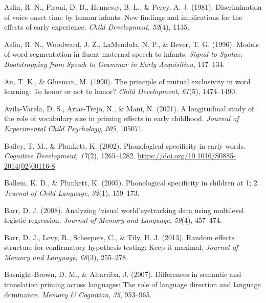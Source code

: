 \documentclass[
  12pt,
  b5paperpaper,
  twoside]{scrreprt}
\newlength{\cslhangindent}
\newlength{\cslentryspacingunit} %
\newenvironment{CSLReferences}[2] %
 {%
  \setlength{\parindent}{0pt}
  \ifodd #1
  \let\oldpar\par
  \def\par{\hangindent=\cslhangindent\oldpar}
  \fi
  \setlength{\parskip}{#2\cslentryspacingunit}
 }%
 {}
\begin{document}
\begin{CSLReferences}{1}{0}
\leavevmode{}%
Aslin, R. N., Pisoni, D. B., Hennessy, B. L., \& Perey, A. J. (1981).
Discrimination of voice onset time by human infants: New findings and
implications for the effects of early experience. \emph{Child
Development}, \emph{52}(4), 1135.

\leavevmode{}%
Aslin, R. N., Woodward, J. Z., LaMendola, N. P., \& Bever, T. G. (1996).
Models of word segmentation in fluent maternal speech to infants.
\emph{Signal to Syntax: Bootstrapping from Speech to Grammar in Early
Acquisition}, 117--134.

\leavevmode{}%
Au, T. K., \& Glusman, M. (1990). The principle of mutual exclusivity in
word learning: To honor or not to honor? \emph{Child Development},
\emph{61}(5), 1474--1490.

\leavevmode{}%
Avila-Varela, D. S., Arias-Trejo, N., \& Mani, N. (2021). A longitudinal
study of the role of vocabulary size in priming effects in early
childhood. \emph{Journal of Experimental Child Psychology}, \emph{205},
105071.

\leavevmode{}%
Bailey, T. M., \& Plunkett, K. (2002). Phonological specificity in early
words. \emph{Cognitive Development}, \emph{17}(2), 1265--1282.
\url{https://doi.org/10.1016/S0885-2014(02)00116-8}

\leavevmode{}%
Ballem, K. D., \& Plunkett, K. (2005). Phonological specificity in
children at 1; 2. \emph{Journal of Child Language}, \emph{32}(1),
159--173.

\leavevmode{}%
Barr, D. J. (2008). Analyzing `visual world'eyetracking data using
multilevel logistic regression. \emph{Journal of Memory and Language},
\emph{59}(4), 457--474.

\leavevmode{}%
Barr, D. J., Levy, R., Scheepers, C., \& Tily, H. J. (2013). Random
effects structure for confirmatory hypothesis testing: Keep it maximal.
\emph{Journal of Memory and Language}, \emph{68}(3), 255--278.

\leavevmode{}%
Basnight-Brown, D. M., \& Altarriba, J. (2007). Differences in semantic
and translation priming across languages: The role of language direction
and language dominance. \emph{Memory \& Cognition}, \emph{35}, 953--965.


\end{CSLReferences}
\end{document}
